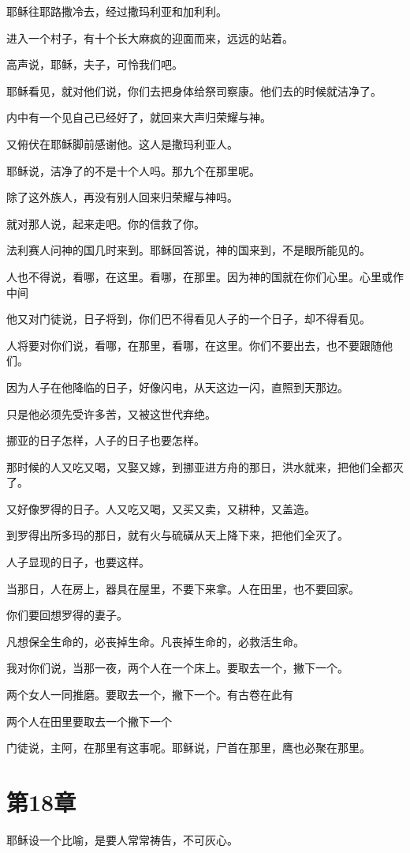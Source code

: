 \documentclass[12pt,oneside]{book}
\begin{document}
耶稣往耶路撒冷去，经过撒玛利亚和加利利。

进入一个村子，有十个长大麻疯的迎面而来，远远的站着。

高声说，耶稣，夫子，可怜我们吧。

耶稣看见，就对他们说，你们去把身体给祭司察康。他们去的时候就洁净了。

内中有一个见自己已经好了，就回来大声归荣耀与神。

又俯伏在耶稣脚前感谢他。这人是撒玛利亚人。

耶稣说，洁净了的不是十个人吗。那九个在那里呢。

除了这外族人，再没有别人回来归荣耀与神吗。

就对那人说，起来走吧。你的信救了你。

法利赛人问神的国几时来到。耶稣回答说，神的国来到，不是眼所能见的。

人也不得说，看哪，在这里。看哪，在那里。因为神的国就在你们心里。心里或作中间

他又对门徒说，日子将到，你们巴不得看见人子的一个日子，却不得看见。

人将要对你们说，看哪，在那里，看哪，在这里。你们不要出去，也不要跟随他们。

因为人子在他降临的日子，好像闪电，从天这边一闪，直照到天那边。

只是他必须先受许多苦，又被这世代弃绝。

挪亚的日子怎样，人子的日子也要怎样。

那时候的人又吃又喝，又娶又嫁，到挪亚进方舟的那日，洪水就来，把他们全都灭了。

又好像罗得的日子。人又吃又喝，又买又卖，又耕种，又盖造。

到罗得出所多玛的那日，就有火与硫磺从天上降下来，把他们全灭了。

人子显现的日子，也要这样。

当那日，人在房上，器具在屋里，不要下来拿。人在田里，也不要回家。

你们要回想罗得的妻子。

凡想保全生命的，必丧掉生命。凡丧掉生命的，必救活生命。

我对你们说，当那一夜，两个人在一个床上。要取去一个，撇下一个。

两个女人一同推磨。要取去一个，撇下一个。有古卷在此有

两个人在田里要取去一个撇下一个

门徒说，主阿，在那里有这事呢。耶稣说，尸首在那里，鹰也必聚在那里。

\chapter{第18章}
耶稣设一个比喻，是要人常常祷告，不可灰心。
\end{document}
